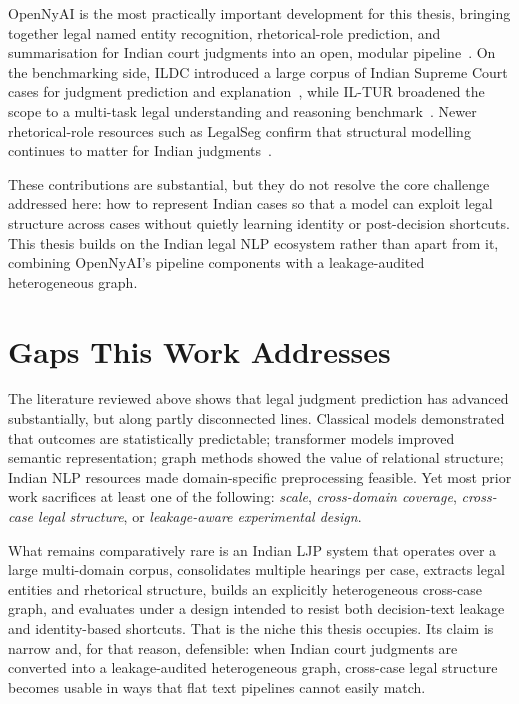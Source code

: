 OpenNyAI is the most practically important development for this thesis, bringing together legal named entity recognition, rhetorical-role prediction, and summarisation for Indian court judgments into an open, modular pipeline~\cite{kalamkar2022ner, opennyai2024docs, opennyai2024about}. On the benchmarking side, ILDC introduced a large corpus of Indian Supreme Court cases for judgment prediction and explanation~\cite{malik2021ildc}, while IL-TUR broadened the scope to a multi-task legal understanding and reasoning benchmark~\cite{joshi2024iltur}. Newer rhetorical-role resources such as LegalSeg confirm that structural modelling continues to matter for Indian judgments~\cite{nigam2025legalseg}.

These contributions are substantial, but they do not resolve the core challenge addressed here: how to represent Indian cases so that a model can exploit legal structure across cases without quietly learning identity or post-decision shortcuts. This thesis builds on the Indian legal NLP ecosystem rather than apart from it, combining OpenNyAI's pipeline components with a leakage-audited heterogeneous graph.

\section{Gaps This Work Addresses}

The literature reviewed above shows that legal judgment prediction has advanced substantially, but along partly disconnected lines. Classical models demonstrated that outcomes are statistically predictable; transformer models improved semantic representation; graph methods showed the value of relational structure; Indian NLP resources made domain-specific preprocessing feasible. Yet most prior work sacrifices at least one of the following: \emph{scale}, \emph{cross-domain coverage}, \emph{cross-case legal structure}, or \emph{leakage-aware experimental design}.

What remains comparatively rare is an Indian LJP system that operates over a large multi-domain corpus, consolidates multiple hearings per case, extracts legal entities and rhetorical structure, builds an explicitly heterogeneous cross-case graph, and evaluates under a design intended to resist both decision-text leakage and identity-based shortcuts. That is the niche this thesis occupies. Its claim is narrow and, for that reason, defensible: when Indian court judgments are converted into a leakage-audited heterogeneous graph, cross-case legal structure becomes usable in ways that flat text pipelines cannot easily match.